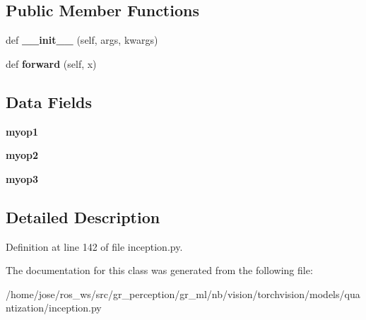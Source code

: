 \subsection*{Public Member Functions}
\begin{DoxyCompactItemize}
\item 
\mbox{\label{classtorchvision_1_1models_1_1quantization_1_1inception_1_1QuantizableInceptionE_a736bd3dbe12d641fb878413032723b25}} 
def {\bfseries \+\_\+\+\_\+init\+\_\+\+\_\+} (self, args, kwargs)
\item 
\mbox{\label{classtorchvision_1_1models_1_1quantization_1_1inception_1_1QuantizableInceptionE_a6601aaae2468efa80824391b3a24246b}} 
def {\bfseries forward} (self, x)
\end{DoxyCompactItemize}
\subsection*{Data Fields}
\begin{DoxyCompactItemize}
\item 
\mbox{\label{classtorchvision_1_1models_1_1quantization_1_1inception_1_1QuantizableInceptionE_a178787fd05c00eb5eaf1cf0ffa31f8c7}} 
{\bfseries myop1}
\item 
\mbox{\label{classtorchvision_1_1models_1_1quantization_1_1inception_1_1QuantizableInceptionE_aed8ef43162d388a29c30356b04e2d654}} 
{\bfseries myop2}
\item 
\mbox{\label{classtorchvision_1_1models_1_1quantization_1_1inception_1_1QuantizableInceptionE_a45fb752a376e2211f26fa20c1f982134}} 
{\bfseries myop3}
\end{DoxyCompactItemize}


\subsection{Detailed Description}


Definition at line 142 of file inception.\+py.



The documentation for this class was generated from the following file\+:\begin{DoxyCompactItemize}
\item 
/home/jose/ros\+\_\+ws/src/gr\+\_\+perception/gr\+\_\+ml/nb/vision/torchvision/models/quantization/inception.\+py\end{DoxyCompactItemize}
